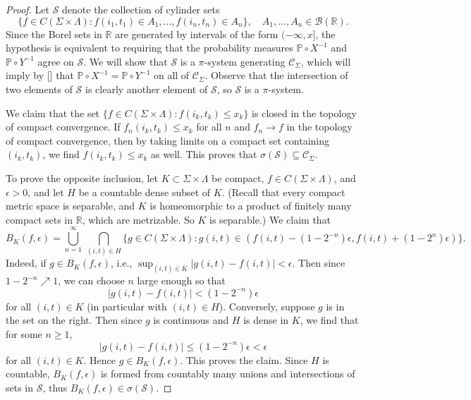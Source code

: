 \begin{proof}
	
	Let $\mathcal{S}$ denote the collection of cylinder sets
	\[
	\{f\in C(\Sigma\times\Lambda) : f(i_1,t_1)\in A_1, \dots, f(i_n,t_n) \in A_n\}, \quad A_1,\dots,A_n\in\mathcal{B}(\mathbb{R}). 
	\]
	Since the Borel sets in $\mathbb{R}$ are generated by intervals of the form $(-\infty,x]$, the hypothesis is equivalent to requiring that the probability measures $\mathbb{P}\circ X^{-1}$ and $\mathbb{P}\circ Y^{-1}$ agree on $\mathcal{S}$. We will show that $\mathcal{S}$ is a $\pi$-system generating $\mathcal{C}_\Sigma$, which will imply by [] that $\mathbb{P}\circ X^{-1} = \mathbb{P}\circ Y^{-1}$ on all of $\mathcal{C}_\Sigma$. Observe that the intersection of two elements of $\mathcal{S}$ is clearly another element of $\mathcal{S}$, so $\mathcal{S}$ is a $\pi$-system. 
	
	We claim that the set $\{f\in C(\Sigma\times\Lambda):f(i_k,t_k)\leq x_k\}$ is closed in the topology of compact convergence. If $f_n(i_k,t_k)\leq x_k$ for all $n$ and $f_n\to f$ in the topology of compact convergence, then by taking limits on a compact set containing $(i_k,t_k)$, we find $f(i_k,t_k)\leq x_k$ as well. This proves that $\sigma(\mathcal{S})\subseteq\mathcal{C}_\Sigma$. 
	
	To prove the opposite inclusion, let $K\subset\Sigma\times\Lambda$ be compact, $f\in C(\Sigma\times\Lambda)$, and $\epsilon>0$, and let $H$ be a countable dense subset of $K$. (Recall that every compact metric space is separable, and $K$ is homeomorphic to a product of finitely many compact sets in $\mathbb{R}$, which are metrizable. So $K$ is separable.) We claim that
	\[
	B_K(f,\epsilon) = \bigcup_{n=1}^\infty\,\bigcap_{(i,t)\in H} \{g\in C(\Sigma\times\Lambda) : g(i,t) \in  (f(i,t)-(1-2^{-n})\epsilon, f(i,t) + (1-2^{n})\epsilon)\}.
	\]
	Indeed, if $g\in B_K(f,\epsilon)$, i.e., $\sup_{(i,t)\in K} |g(i,t)-f(i,t)| < \epsilon$. Then since $1-2^{-n}\nearrow 1$, we can choose $n$ large enough so that 
	\[
	|g(i,t)-f(i,t)| < (1-2^{-n})\epsilon
	\] 
	for all $(i,t)\in K$ (in particular with $(i,t)\in H$). Conversely, suppose $g$ is in the set on the right. Then since $g$ is continuous and $H$ is dense in $K$, we find that for some $n\geq 1$,
	\[
	|g(i,t)-f(i,t)| \leq (1-2^{-n})\epsilon < \epsilon
	\]
	for all $(i,t)\in K$. Hence $g\in B_K(f,\epsilon)$. This proves the claim. Since $H$ is countable, $B_K(f,\epsilon)$ is formed from countably many unions and intersections of sets in $\mathcal{S}$, thus $B_K(f,\epsilon)\in\sigma(\mathcal{S})$.
	

\end{proof}

